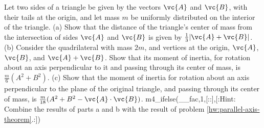 Let two sides of a triangle be given by the vectors $\vc{A}$ and $\vc{B}$, with their tails
at the origin, and
let mass $m$ be uniformly distributed
on the interior of the triangle.
(a) Show that the distance of the triangle's center of mass from the intersection
of sides $\vc{A}$ and $\vc{B}$ is given by $\frac{1}{3}|\vc{A}+\vc{B}|$.\hwendpart
(b) Consider the quadrilateral with mass $2m$, and vertices at the origin, $\vc{A}$, $\vc{B}$, and $\vc{A}+\vc{B}$.
Show that its moment of inertia, for rotation about an axis perpendicular to it and passing through its center of mass,
is $\frac{m}{6}(A^2+B^2)$.\hwendpart
(c) Show that the moment of inertia for rotation about an axis perpendicular to
the plane of the original triangle, and passing through its center of mass, is $\frac{m}{18}(A^2+B^2-\vc{A}\cdot\vc{B})$.
m4_ifelse(__fac,1,[::],[:Hint: Combine the results of parts a and b with the result of problem \ref{hw:parallel-axis-theorem}.:])

